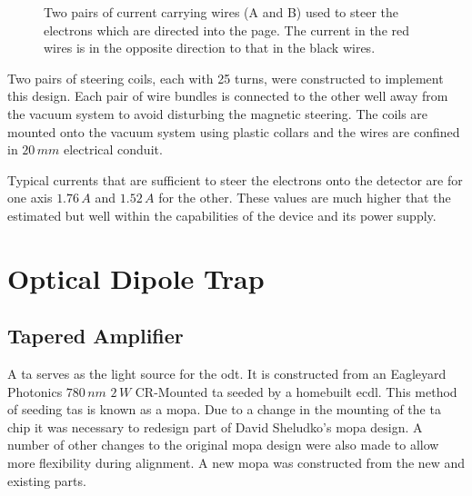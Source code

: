 \begin{figure}[h]
\centering
{}
\caption{Two pairs of current carrying wires (A and B) used to steer the electrons which are directed into the page. The current in the red wires is in the opposite direction to that in the black wires.}
\label{fig:mag_steering}
\end{figure}

Two pairs of steering coils, each with 25 turns, were constructed to implement this design. Each pair of wire bundles is connected to the other well away from the vacuum system to avoid disturbing the magnetic steering. The coils are mounted onto the vacuum system using plastic collars and the wires are confined in $20\,\unit{mm}$ electrical conduit.

Typical currents that are sufficient to steer the electrons onto the detector are for one axis $1.76\,\unit{A}$ and $1.52\,\unit{A}$ for the other. These values are much higher that the estimated but well within the capabilities of the device and its power supply.

\section{Optical Dipole Trap}

\subsection{Tapered Amplifier}
A \gls{ta} serves as the light source for the \gls{odt}. It is constructed from an Eagleyard Photonics $780\,\unit{nm}$ $2\,\unit{W}$ CR-Mounted \gls{ta} seeded by a homebuilt \gls{ecdl}. This method of seeding \glspl{ta} is known as a \gls{mopa}\cite{wilson_narrow-linewidth_1998}. Due to a change in the mounting of the \gls{ta} chip it was necessary to redesign part of David Sheludko's \gls{mopa} design\cite{sheludko_shaped_2010}. A number of other changes to the original \gls{mopa} design were also made to allow more flexibility during alignment. A new \gls{mopa} was constructed from the new and existing parts.

